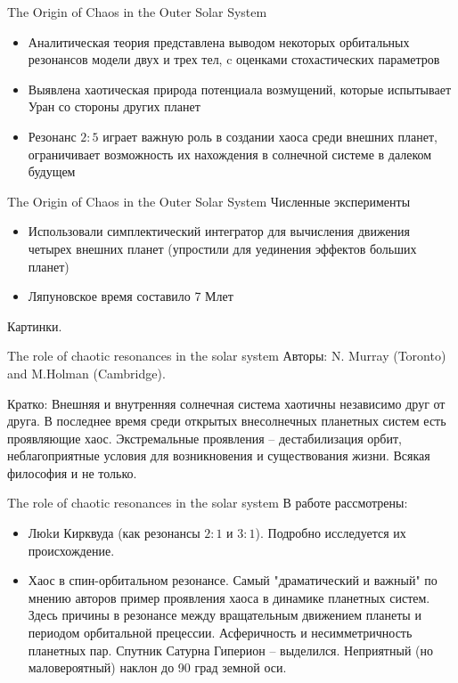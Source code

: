 \documentclass{beamer}
\begin{document}
\begin{frame}{The Origin of Chaos in the Outer Solar System}
        \begin{itemize}
                \item Аналитическая теория представлена выводом некоторых орбитальных резонансов модели двух и трех тел, c оценками стохастических параметров
                \item Выявлена хаотическая природа потенциала возмущений, которые испытывает Уран со стороны других планет
                \item Резонанс $2:5$ играет важную роль в создании хаоса среди внешних планет, ограничивает возможность их нахождения в солнечной системе в далеком будущем
        \end{itemize}
\end{frame}

\begin{frame}{The Origin of Chaos in the Outer Solar System}
        Численные эксперименты
        \begin{itemize}
                \item Использовали симплектический интегратор для вычисления движения четырех внешних планет (упростили для уединения эффектов больших планет)
                \item Ляпуновское время составило 7 Млет
        \end{itemize}
        Картинки.
\end{frame}


\begin{frame}{The role of chaotic resonances in the solar system}
        Авторы: N. Murray (Toronto) and M.Holman (Cambridge).

        Кратко: Внешняя и внутренняя солнечная система хаотичны независимо друг от друга. В последнее время среди открытых внесолнечных планетных систем есть проявляющие хаос. Экстремальные проявления -- дестабилизация орбит, неблагоприятные условия для возникновения и существования жизни. Всякая философия и не только.
\end{frame}


\begin{frame}{The role of chaotic resonances in the solar system}
        В работе рассмотрены:
        \begin{itemize}
                \item Люkи Кирквуда (как резонансы $2:1$ и $3:1$). Подробно исследуется их происхождение.
                \item Хаос в спин-орбитальном резонансе. Самый "драматический и важный" по мнению авторов пример проявления хаоса в динамике планетных систем. Здесь причины в резонансе между вращательным движением планеты и периодом орбитальной прецессии. Асферичность и несимметричность планетных пар. Спутник Сатурна Гиперион -- выделился. Неприятный (но маловероятный) наклон до 90 град земной оси.

        \end{itemize}
\end{frame}
\end{document}
